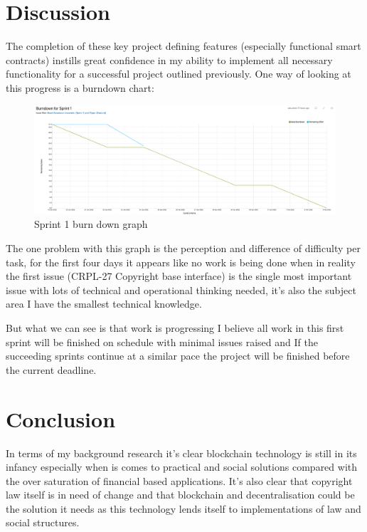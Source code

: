 \documentclass[12pt]{report}
\begin{document}
\chapter{Discussion}

The completion of these key project defining features (especially functional smart contracts) instills great confidence in my ability to implement all necessary functionality for a successful project outlined previously. One way of looking at this progress is a burndown chart:

\begin{figure}
	\caption{Sprint 1 burn down graph}
	\includegraphics[width=1\textwidth]{images/sprint-1-Burn}
\end{figure}

The one problem with this graph is the perception and difference of difficulty per task, for the first four days it appears like no work is being done when in reality the first issue (CRPL-27 Copyright base interface) is the single most important issue with lots of technical and operational thinking needed, it's also the subject area I have the smallest technical knowledge.

But what we can see is that work is progressing I believe all work in this first sprint will be finished on schedule with minimal issues raised and If the succeeding sprints continue at a similar pace the project will be finished before the current deadline.


\chapter{Conclusion}

In terms of my background research it's clear blockchain technology is still in its infancy especially when is comes to practical and social solutions compared with the over saturation of financial based applications. It's also clear that copyright law itself is in need of change and that blockchain and decentralisation could be the solution it needs as this technology lends itself to implementations of law and social structures.
\end{document}
